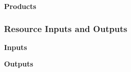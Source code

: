 \documentclass{report}
\begin{document}

\textbf{Products}



\subsubsection{Resource Inputs and Outputs}



\textbf{Inputs}


\textbf{Outputs}

\end{document}
